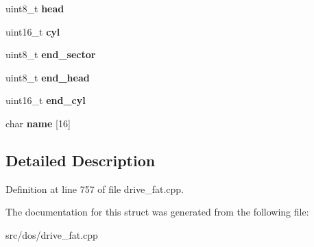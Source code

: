 \begin{DoxyCompactItemize}
\item 
\hypertarget{struct__PC98RawPartition_a159d590fdf1918ef8ba4fa37ffbb896d}{uint8\-\_\-t {\bfseries head}}\label{struct__PC98RawPartition_a159d590fdf1918ef8ba4fa37ffbb896d}

\item 
\hypertarget{struct__PC98RawPartition_ac1a8dc3e314587ea5bceb09b1d960643}{uint16\-\_\-t {\bfseries cyl}}\label{struct__PC98RawPartition_ac1a8dc3e314587ea5bceb09b1d960643}

\item 
\hypertarget{struct__PC98RawPartition_ae9213f512993e8dd4fdbe2409ef3a402}{uint8\-\_\-t {\bfseries end\-\_\-sector}}\label{struct__PC98RawPartition_ae9213f512993e8dd4fdbe2409ef3a402}

\item 
\hypertarget{struct__PC98RawPartition_ad005cde8a52522ccc7efc9e7aa97db80}{uint8\-\_\-t {\bfseries end\-\_\-head}}\label{struct__PC98RawPartition_ad005cde8a52522ccc7efc9e7aa97db80}

\item 
\hypertarget{struct__PC98RawPartition_a23df046ffa51a15203ef87662debd38b}{uint16\-\_\-t {\bfseries end\-\_\-cyl}}\label{struct__PC98RawPartition_a23df046ffa51a15203ef87662debd38b}

\item 
\hypertarget{struct__PC98RawPartition_ac3401e613d79b53415085b2a53c34fab}{char {\bfseries name} \mbox{[}16\mbox{]}}\label{struct__PC98RawPartition_ac3401e613d79b53415085b2a53c34fab}

\end{DoxyCompactItemize}


\subsection{Detailed Description}


Definition at line 757 of file drive\-\_\-fat.\-cpp.



The documentation for this struct was generated from the following file\-:\begin{DoxyCompactItemize}
\item 
src/dos/drive\-\_\-fat.\-cpp\end{DoxyCompactItemize}
